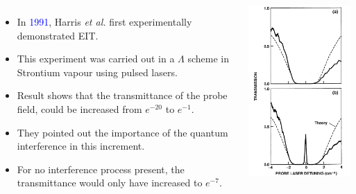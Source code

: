\documentclass[9pt,aspectratio94]{beamer}
\begin{document}
\begin{frame}
\begin{columns}
 \begin{itemize}
 
         \item In \textcolor{blue}{1991}, Harris \textit{et al.} first experimentally demonstrated EIT.
\item  This experiment was carried out in a $\Lambda$ scheme in Strontium vapour using pulsed lasers.
\item  Result shows that the transmittance of the probe field, could be increased from $ e^{-20} $ to $ e^{-1} $.
\item  They pointed out the importance of the quantum interference in this increment. 
\item  For no interference process present, the transmittance would only have increased to $ e^{-7} $.
\end{itemize}
    \includegraphics[scale=0.5]{1steit.png}
    
\end{columns}
\end{frame}
\end{document}
